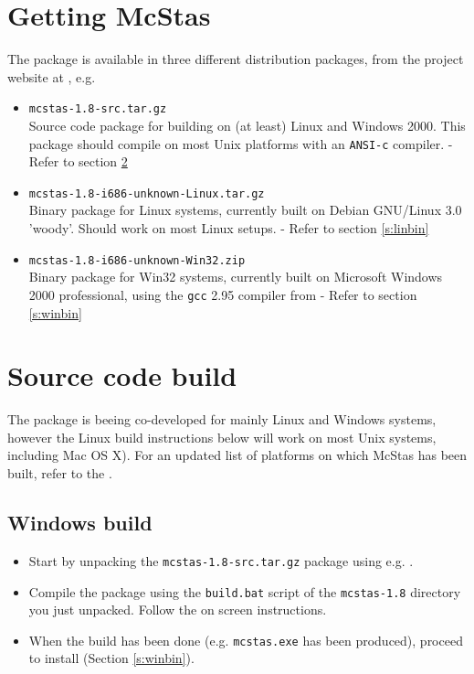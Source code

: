 \section{Getting McStas}
\label{s:obtain}
The  package is
available in three different distribution packages, from the project
website at
, e.g.
\begin{itemize}
\item{\texttt{mcstas-1.8-src.tar.gz}\\Source code package for
    building  on
    (at least) Linux and Windows 2000. This package should compile on
    most Unix platforms with an \texttt{ANSI-c} compiler. - Refer to section \ref{s:src}}
\item{\texttt{mcstas-1.8-i686-unknown-Linux.tar.gz}\\Binary package
  for Linux systems, currently built on Debian GNU/Linux 3.0 'woody'. 
  Should work on most Linux setups.
 - Refer to section \ref{s:linbin}}
\item{\texttt{mcstas-1.8-i686-unknown-Win32.zip}\\Binary package
  for Win32 systems, currently built on Microsoft Windows 2000
  professional, using the \texttt{gcc} 2.95 compiler from 
   - Refer to section \ref{s:winbin}}
\end{itemize}

\section{Source code build}
\label{s:src}
The  package is
beeing co-developed for mainly Linux and Windows systems, however 
the Linux build instructions below will work on most Unix
systems, including Mac OS X). For an updated list of platforms on which McStas has been
built, refer to the .

\subsection{Windows build}
\begin{itemize}
\item{Start by unpacking the \texttt{mcstas-1.8-src.tar.gz} package using
e.g. .}
\item{Compile the  package using the \texttt{build.bat} script of the
\texttt{mcstas-1.8} directory you just unpacked. Follow the on screen
instructions.} 
\item{When the build has been done (e.g. \texttt{mcstas.exe}
has been produced), proceed to install (Section \ref{s:winbin}).}
\end{itemize}

